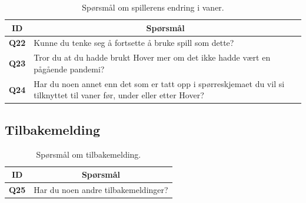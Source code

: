 \begin{table}[H]
    \centering
    \begin{tabularx}{\textwidth}{|c|X|}
        \hline
        \textbf{ID} & \multicolumn{1}{c|}{\textbf{Spørsmål}} \\ \hline
        \textbf{Q22} & Kunne du tenke seg å fortsette å bruke spill som dette?  \\
        \textbf{Q23} & Tror du at du hadde brukt Hover mer om det ikke hadde vært en pågående pandemi?  \\
        \textbf{Q24} & Har du noen annet enn det som er tatt opp i spørreskjemaet du vil si tilknyttet til vaner før, under eller etter Hover? \\ \hline
    \end{tabularx}
    \caption{Spørsmål om spillerens endring i vaner.}
    \label{tab:appendix_no_player_habits_questions}
\end{table}

\subsection*{Tilbakemelding} 
\begin{table}[H]
    \centering
    \begin{tabularx}{\textwidth}{|c|X|}
        \hline
        \textbf{ID} & \multicolumn{1}{c|}{\textbf{Spørsmål}} \\ \hline
        \textbf{Q25} & Har du noen andre tilbakemeldinger?  \\ \hline
    \end{tabularx}
    \caption{Spørsmål om tilbakemelding.}
    \label{tab:appendix_no_feedback_questions}
\end{table}

